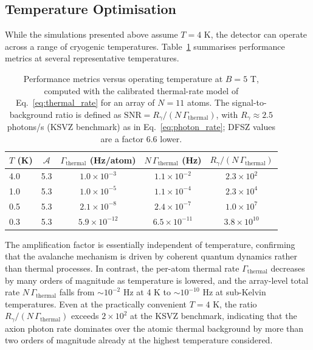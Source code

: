 \subsection*{Temperature Optimisation}

While the simulations presented above assume $T = 4$ K, the detector can operate across a range of cryogenic temperatures. Table~\ref{tab:temperature_scan} summarises performance metrics at several representative temperatures.

\begin{table}[htbp]
\centering
\caption{Performance metrics versus operating temperature at $B = 5$ T, computed with the calibrated thermal-rate model of Eq.~\eqref{eq:thermal_rate} for an array of $N=11$ atoms. The signal-to-background ratio is defined as $\mathrm{SNR}=R_\gamma/(N\,\Gamma_{\mathrm{thermal}})$, with $R_\gamma\!\approx\!2.5$ photons/s (KSVZ benchmark) as in Eq.~\eqref{eq:photon_rate}; DFSZ values are a factor $6.6$ lower.}
\label{tab:temperature_scan}
\begin{tabular}{lcccc}
\hline\hline
$T$ (K) & $\mathcal{A}$ & $\Gamma_{\mathrm{thermal}}$ (Hz/atom) & $N\,\Gamma_{\mathrm{thermal}}$ (Hz) & $R_\gamma/(N\,\Gamma_{\mathrm{thermal}})$ \\
\hline
4.0 & 5.3 & $1.0\times 10^{-3}$ & $1.1\times 10^{-2}$ & $2.3\times 10^{2}$ \\
1.0 & 5.3 & $1.0\times 10^{-5}$ & $1.1\times 10^{-4}$ & $2.3\times 10^{4}$ \\
0.5 & 5.3 & $2.1\times 10^{-8}$ & $2.4\times 10^{-7}$ & $1.0\times 10^{7}$ \\
0.3 & 5.3 & $5.9\times 10^{-12}$ & $6.5\times 10^{-11}$ & $3.8\times 10^{10}$ \\
\hline\hline
\end{tabular}
\end{table}

The amplification factor is essentially independent of temperature, confirming that the avalanche mechanism is driven by coherent quantum dynamics rather than thermal processes. In contrast, the per-atom thermal rate $\Gamma_{\mathrm{thermal}}$ decreases by many orders of magnitude as temperature is lowered, and the array-level total rate $N\,\Gamma_{\mathrm{thermal}}$ falls from $\sim\!10^{-2}$ Hz at 4 K to $\sim\!10^{-10}$ Hz at sub-Kelvin temperatures. Even at the practically convenient $T=4$ K, the ratio $R_\gamma/(N\,\Gamma_{\mathrm{thermal}})$ exceeds $2\times10^{2}$ at the KSVZ benchmark, indicating that the axion photon rate dominates over the atomic thermal background by more than two orders of magnitude already at the highest temperature considered.

